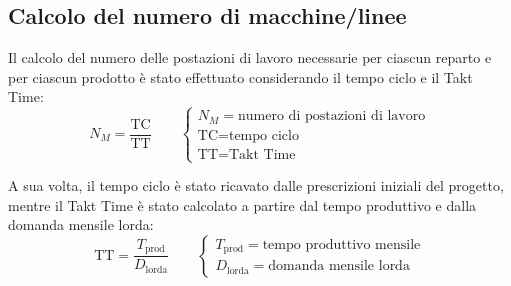 \documentclass[11pt]{article}
\begin{document}
\subsection{Calcolo del numero di macchine/linee}
Il calcolo del numero delle postazioni di lavoro necessarie per ciascun reparto e per ciascun prodotto è stato effettuato considerando il tempo ciclo e il Takt Time:
\begin{equation}
    N_M = \frac{\text{TC}}{\text{TT}}
    \qquad
    \begin{cases}
        N_M = \text{numero di postazioni di lavoro} \\
        \text{TC} = \text{tempo ciclo} \\
        \text{TT} = \text{Takt Time}
    \end{cases}
\end{equation}

A sua volta, il tempo ciclo è stato ricavato dalle prescrizioni iniziali del progetto, mentre il Takt Time è stato calcolato a partire dal tempo produttivo e dalla domanda mensile lorda:
\begin{equation}
    \text{TT} = \frac{T_\text{prod}}{D_\text{lorda}}
    \qquad
    \begin{cases}
        T_\text{prod} = \text{tempo produttivo mensile} \\
        D_\text{lorda} = \text{domanda mensile lorda}
    \end{cases}
\end{equation}
\end{document}
